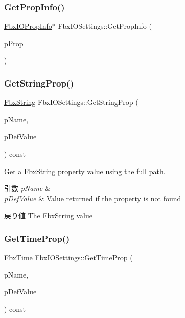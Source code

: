 \subsubsection{\texorpdfstring{Get\+Prop\+Info()}{GetPropInfo()}}
{\footnotesize\ttfamily \hyperlink{class_fbx_i_o_prop_info}{Fbx\+I\+O\+Prop\+Info}$\ast$ Fbx\+I\+O\+Settings\+::\+Get\+Prop\+Info (\begin{DoxyParamCaption}\item[{\hyperlink{class_fbx_property}{Fbx\+Property} \&}]{p\+Prop }\end{DoxyParamCaption})}

\mbox{\label{class_fbx_i_o_settings_ab3e057be50be4fbeae6e70ceb38cf1fa}} 
\subsubsection{\texorpdfstring{Get\+String\+Prop()}{GetStringProp()}}
{\footnotesize\ttfamily \hyperlink{class_fbx_string}{Fbx\+String} Fbx\+I\+O\+Settings\+::\+Get\+String\+Prop (\begin{DoxyParamCaption}\item[{const char $\ast$}]{p\+Name,  }\item[{\hyperlink{class_fbx_string}{Fbx\+String}}]{p\+Def\+Value }\end{DoxyParamCaption}) const}

Get a \hyperlink{class_fbx_string}{Fbx\+String} property value using the full path. 
\begin{DoxyParams}{引数}
{\em p\+Name} & \\
\hline
{\em p\+Def\+Value} & Value returned if the property is not found \\
\hline
\end{DoxyParams}
\begin{DoxyReturn}{戻り値}
The \hyperlink{class_fbx_string}{Fbx\+String} value 
\end{DoxyReturn}
\mbox{\label{class_fbx_i_o_settings_a369d87d5f1785484917a44abd5f70bd3}} 
\subsubsection{\texorpdfstring{Get\+Time\+Prop()}{GetTimeProp()}}
{\footnotesize\ttfamily \hyperlink{class_fbx_time}{Fbx\+Time} Fbx\+I\+O\+Settings\+::\+Get\+Time\+Prop (\begin{DoxyParamCaption}\item[{const char $\ast$}]{p\+Name,  }\item[{\hyperlink{class_fbx_time}{Fbx\+Time}}]{p\+Def\+Value }\end{DoxyParamCaption}) const}

